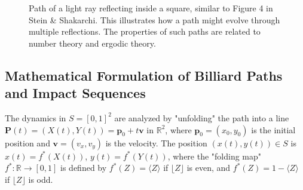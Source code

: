 \documentclass[12pt]{article}
\newcommand{\R}{\mathbb{R}}
\begin{document}
\begin{figure}[h!]
\centering
{}
\caption{Path of a light ray reflecting inside a square, similar to Figure 4 in Stein \& Shakarchi. This illustrates how a path might evolve through multiple reflections. The properties of such paths are related to number theory and ergodic theory.}
\label{fig:billiards}
\end{figure}

\subsection*{Mathematical Formulation of Billiard Paths and Impact Sequences}
The dynamics in $S = [0,1]^2$ are analyzed by "unfolding" the path into a line $\mathbf{P}(t) = (X(t),Y(t)) = \mathbf{p}_0 + t\mathbf{v}$ in $\R^2$, where $\mathbf{p}_0=(x_0,y_0)$ is the initial position and $\mathbf{v}=(v_x,v_y)$ is the velocity. The position $(x(t),y(t)) \in S$ is $x(t)=f^*(X(t))$, $y(t)=f^*(Y(t))$, where the "folding map" $f^*: \R \to [0,1]$ is defined by $f^*(Z) = \langle Z \rangle$ if $\lfloor Z \rfloor$ is even, and $f^*(Z) = 1-\langle Z \rangle$ if $\lfloor Z \rfloor$ is odd.
\end{document}

